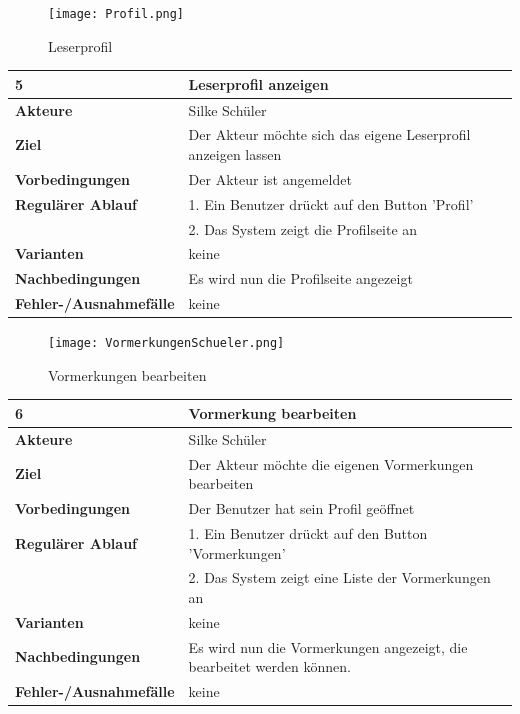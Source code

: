 \documentclass[fontsize=12pt,paper=a4,twoside]{scrartcl}
\begin{document}
\begin{figure}
	[H] \caption{Leserprofil} 
	\texttt{[image: Profil.png]} \label{pic:Profil} 
\end{figure}
\begin{table}
	[H] \label{5} 
	\begin{tabular}
		{|l|p{10cm}|} \hline \textbf{5} & \textbf{Leserprofil anzeigen} \\
		\hline \textbf{Akteure} & Silke Schüler\\
		\hline \textbf{Ziel} & Der Akteur möchte sich das eigene Leserprofil anzeigen lassen\\\hline \textbf{Vorbedingungen} & Der Akteur ist angemeldet\\
		\hline \textbf{Regulärer Ablauf} & 1. Ein Benutzer drückt auf den Button 'Profil'\\
		&2. Das System zeigt die Profilseite an\\
		\hline \textbf{Varianten} & keine \\
		\hline \textbf{Nachbedingungen} & Es wird nun die Profilseite angezeigt\\
		\hline \textbf{Fehler-/Ausnahmefälle} & keine\\
		\hline 
	\end{tabular}
\end{table}
\begin{figure}
	[H] \caption{Vormerkungen bearbeiten} 
	\texttt{[image: VormerkungenSchueler.png]} \label{pic:Vormerkungen} 
\end{figure}
\begin{table}
	[H] \label{6} 
	\begin{tabular}
		{|l|p{10cm}|} \hline \textbf{6} & \textbf{Vormerkung bearbeiten}\\
		\hline \textbf{Akteure} & Silke Schüler\\
		\hline \textbf{Ziel} & Der Akteur möchte die eigenen Vormerkungen bearbeiten \\
		\hline \textbf{Vorbedingungen} & Der Benutzer hat sein Profil geöffnet\\
		\hline \textbf{Regulärer Ablauf} & 1. Ein Benutzer drückt auf den Button 'Vormerkungen'\\
		&2. Das System zeigt eine Liste der Vormerkungen an\\
		\hline \textbf{Varianten} & keine\\
		\hline \textbf{Nachbedingungen} & Es wird nun die Vormerkungen angezeigt, die bearbeitet werden können.\\
		\hline \textbf{Fehler-/Ausnahmefälle} & keine\\
		\hline 
	\end{tabular}
\end{table}
\end{document}
